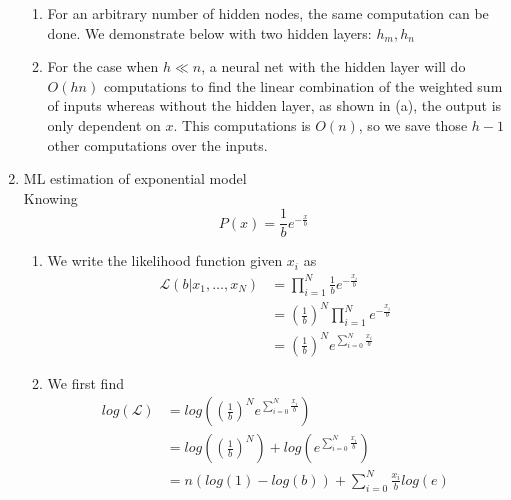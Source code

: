 \documentclass{article}
\begin{document}
\begin{enumerate}
\begin{enumerate}
            \item %
                For an arbitrary number of hidden nodes, the same
                computation can be done. We demonstrate below with two
                hidden layers: \(h_m, h_n\)
            \item %
                For the case when \(h \ll n\), a neural net with the hidden
                layer will do \(O(hn)\) computations to find the linear
                combination of the weighted sum of inputs whereas without
                the hidden layer, as shown in (a), the output is only
                dependent on \(x\). This computations is \(O(n)\), so we 
                save those \(h-1\) other computations over the inputs.
        \end{enumerate}
    \item ML estimation of exponential model \\ %
        Knowing
        \begin{equation*}
            P(x) = \frac{1}{b}e^{-\frac{x}{b}}
        \end{equation*}
        \begin{enumerate}
            \item %
                We write the likelihood function given \(x_i\) as
                \begin{align*}
                \mathcal{L}(b|x_1,\hdots,x_N) 
                &= \prod_{i = 1}^N \frac{1}{b}e^{-\frac{x_i}{b}}\\
                &= \left(\frac{1}{b}\right)^N \prod_{i = 1}^N e^{-\frac{x_i}{b}}\\
                &= \left(\frac{1}{b}\right)^N e^{\sum_{i=0}^N \frac{x_i}{b}}
                \end{align*}

            \item %
                We first find
                \begin{align*}
                log(\mathcal{L}) 
                    &= log\left(\left(\frac{1}{b}\right)^N e^{\sum_{i=0}^N 
                        \frac{x_i}{b}}\right)\\
                    &= log\left(\left(\frac{1}{b}\right)^N\right) + 
                        log\left(e^{\sum_{i=0}^N \frac{x_i}{b}}\right)\\
                    &= n(log(1) - log(b)) + \sum_{i=0}^N \frac{x_i}{b}log(e)
                \end{align*}


\end{enumerate}
\end{enumerate}
\end{document}
